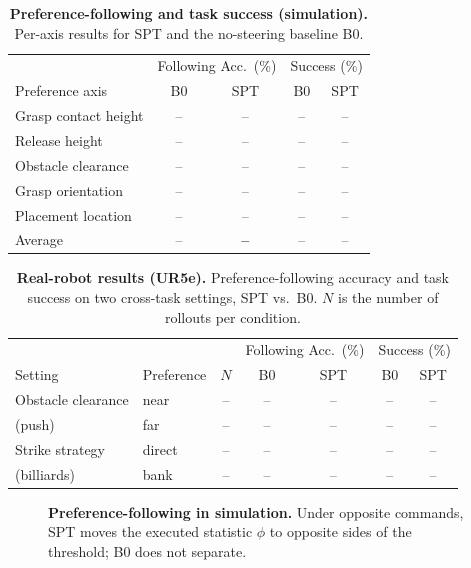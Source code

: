 \documentclass{article}
\begin{document}
\begin{table}[t]
  \centering
  \small
  \caption{\textbf{Preference-following and task success (simulation).} Per-axis
  results for SPT and the no-steering baseline B0.}
  \label{tab:sim_main}
  \begin{tabular}{lcccc}
    \hline
    & \multicolumn{2}{c}{Following Acc.\ (\%)} & \multicolumn{2}{c}{Success (\%)} \\
    Preference axis & B0 & SPT & B0 & SPT \\
    \hline
    Grasp contact height & -- & -- & -- & -- \\
    Release height       & -- & -- & -- & -- \\
    Obstacle clearance   & -- & -- & -- & -- \\
    Grasp orientation    & -- & -- & -- & -- \\
    Placement location   & -- & -- & -- & -- \\
    \hline
    Average              & -- & \textbf{--} & -- & -- \\
    \hline
  \end{tabular}
\end{table}

\begin{table}[t]
  \centering
  \small
  \caption{\textbf{Real-robot results (UR5e).} Preference-following accuracy and
  task success on two cross-task settings, SPT vs.\ B0. $N$ is the number of
  rollouts per condition.}
  \label{tab:real_main}
  \begin{tabular}{llccccc}
    \hline
    & & & \multicolumn{2}{c}{Following Acc.\ (\%)} & \multicolumn{2}{c}{Success (\%)} \\
    Setting & Preference & $N$ & B0 & SPT & B0 & SPT \\
    \hline
    Obstacle clearance & near   & -- & -- & -- & -- & -- \\
    (push)             & far    & -- & -- & -- & -- & -- \\
    Strike strategy    & direct & -- & -- & -- & -- & -- \\
    (billiards)        & bank   & -- & -- & -- & -- & -- \\
    \hline
  \end{tabular}
\end{table}

\begin{figure}[t]
  \centering
  \caption{\textbf{Preference-following in simulation.} Under opposite commands,
  SPT moves the executed statistic $\phi$ to opposite sides of the threshold;
  B0 does not separate.}
  \label{fig:sim_dist}
\end{figure}
\end{document}

